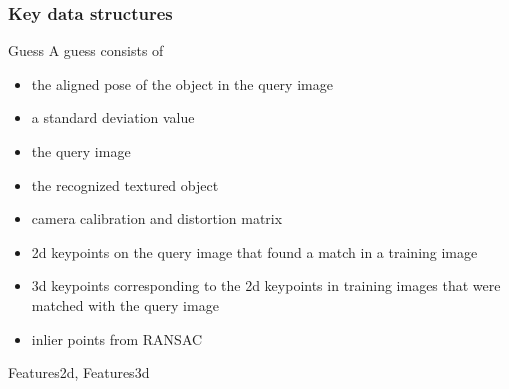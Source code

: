 \subsubsection*{Key data structures}
Guess
A guess consists of
\begin{itemize}
    \item the aligned pose of the object in the query image
    \item a standard deviation value
    \item the query image
    \item the recognized textured object
    \item camera calibration and distortion matrix
    \item 2d keypoints on the query image that found a match in a training image
    \item 3d keypoints corresponding to the 2d keypoints in training images that were matched with the query image
    \item inlier points from RANSAC
\end{itemize}

Features2d, Features3d


